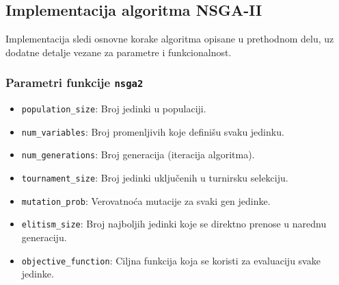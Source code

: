 \documentclass[12pt]{article}
\begin{document}
\subsection{Implementacija algoritma NSGA-II}
Implementacija sledi osnovne korake algoritma opisane u prethodnom delu, uz dodatne detalje vezane za parametre i funkcionalnost. 

\subsubsection*{Parametri funkcije \texttt{nsga2}}
\begin{itemize}
    \item \texttt{population\_size}: Broj jedinki u populaciji.
    \item \texttt{num\_variables}: Broj promenljivih koje definišu svaku jedinku.
    \item \texttt{num\_generations}: Broj generacija (iteracija algoritma).
    \item \texttt{tournament\_size}: Broj jedinki uključenih u turnirsku selekciju.
    \item \texttt{mutation\_prob}: Verovatnoća mutacije za svaki gen jedinke.
    \item \texttt{elitism\_size}: Broj najboljih jedinki koje se direktno prenose u narednu generaciju.
    \item \texttt{objective\_function}: Ciljna funkcija koja se koristi za evaluaciju svake jedinke.
\end{itemize}
\end{document}
